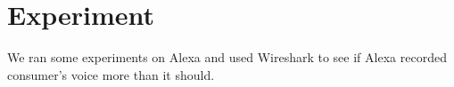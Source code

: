 
%
%
%
%
%

\section{Experiment}

We ran some experiments on Alexa and used Wireshark to see if Alexa recorded consumer's voice more than it should.

